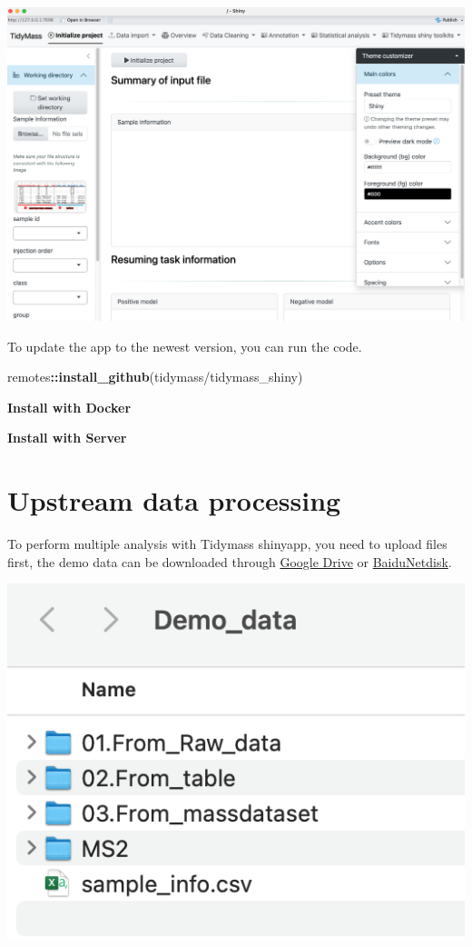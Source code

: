 \documentclass[
]{book}
\newenvironment{Shaded}{\begin{snugshade}}{\end{snugshade}}
\newcommand{\FunctionTok}[1]{\textcolor[rgb]{0.13,0.29,0.53}{\textbf{#1}}}
\newcommand{\NormalTok}[1]{#1}
\newcommand{\SpecialCharTok}[1]{\textcolor[rgb]{0.81,0.36,0.00}{\textbf{#1}}}
\newcommand{\StringTok}[1]{\textcolor[rgb]{0.31,0.60,0.02}{#1}}
\begin{document}
\includegraphics{figures/shinyapp.png}

To update the app to the newest version, you can run the code.

\begin{Shaded}
\begin{Highlighting}[]
\NormalTok{remotes}\SpecialCharTok{::}\FunctionTok{install\_github}\NormalTok{(}\StringTok{\textquotesingle{}tidymass/tidymass\_shiny\textquotesingle{}}\NormalTok{)}
\end{Highlighting}
\end{Shaded}

\textbf{Install with Docker}

\textbf{Install with Server}

\chapter{Upstream data processing}\label{upstream-data-processing}

To perform multiple analysis with Tidymass shinyapp, you need to upload files first, the demo data can be downloaded through \href{https://drive.google.com/file/d/10OmQjZApoqJcd163X5C67pij2yZGWHnF/view?usp=sharing}{Google Drive} or \href{https://pan.baidu.com/s/1QfwGN29dJ5mxtKmKUBo9NA?pwd=iacm}{BaiduNetdisk}.

\includegraphics{figures/demo_data.png}
\end{document}
